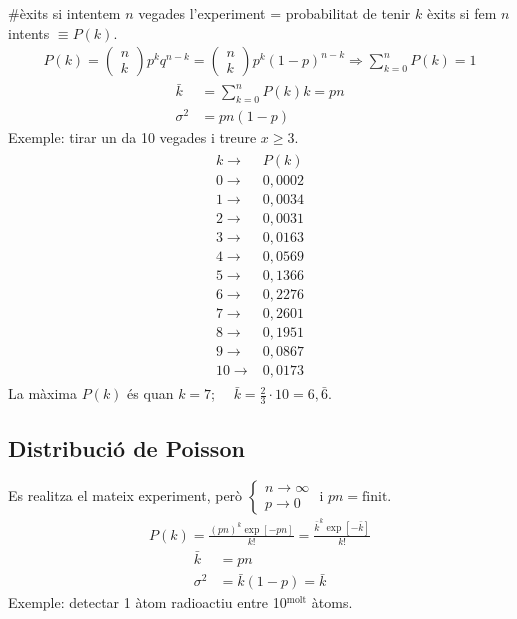 $\#$èxits si intentem $n$ vegades l'experiment = probabilitat de tenir $k$ èxits si fem $n$ intents $\equiv P(k)$.
\begin{align}
    P(k) = \begin{pmatrix} n \\ k \end{pmatrix} p^{k} q^{n-k} = \begin{pmatrix} n \\ k \end{pmatrix} p^{k} (1-p)^{n-k} \Rightarrow \sum\limits_{k=0}^{n} P(k) = 1
\end{align}
\begin{align}
    \bar{k} & = \sum\limits_{k=0}^{n} P(k)k = pn \\
    \sigma^{2} & = pn (1-p)
\end{align}
Exemple: tirar un da 10 vegades i treure $x\geq 3$.
\begin{align*}
\begin{split}
    k \to & P(k) \\
    0 \to & 0,0002 \\
    1 \to & 0,0034 \\
    2 \to & 0,0031 \\
    3 \to & 0,0163 \\
    4 \to & 0,0569 \\
    5 \to & 0,1366 \\
    6 \to & 0,2276 \\
    7 \to & 0,2601 \\
    8 \to & 0,1951 \\
    9 \to & 0,0867 \\
    10 \to & 0,0173
\end{split}
\end{align*}
La màxima $P(k)$ és quan $k=7$; $\quad \bar{k} = \frac{2}{3} \cdot 10 = 6,\bar{6}$.

\subsection{Distribució de Poisson}
Es realitza el mateix experiment, però $\begin{cases} n \to \infty \\ p \to 0 \end{cases}$ i $pn = \text{finit}$.
\begin{align}
    P(k)= \frac{(pn)^{k} \exp [-pn]}{k!} = \frac{\bar{k}^{k} \exp [-\bar{k}]}{k!}
\end{align}
\begin{align}
    \bar{k} & = pn \\
    \sigma^{2} & = \bar{k} (1-p) = \bar{k}
\end{align}
Exemple: detectar 1 àtom radioactiu entre 10$^{\text{molt}}$ àtoms.

